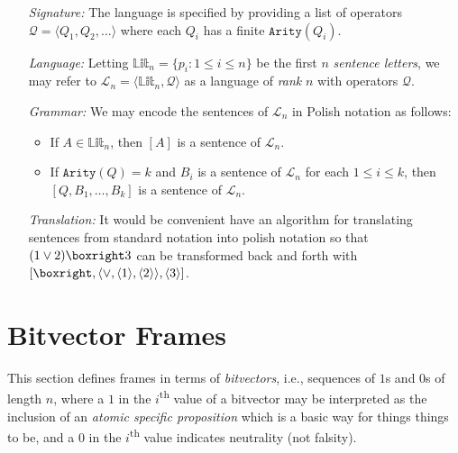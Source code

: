 \documentclass[a4paper, 11pt]{article} %
\newcommand{\tuple}[1]{\langle#1\rangle} %
\newcommand{\set}[1]{\lbrace#1\rbrace} %
\newcommand{\Lit}[0]{\mathbb{Lit}}
\newcommand{\arity}[1]{\texttt{Arity}(#1)}
\renewcommand{\L}[0]{\mathcal{L}}
\newcommand{\Q}[0]{\mathcal{Q}}
\begin{document}
\begin{enumerate}
  \item[\it Signature:] The language is specified by providing a list of operators $\Q=\tuple{Q_1,Q_2,\ldots}$ where each $Q_i$ has a finite $\arity{Q_i}$.
  \item[\it Language:] Letting $\Lit_n=\set{p_i:1\leq i\leq n}$ be the first $n$ \textit{sentence letters}, we may refer to $\L_n=\tuple{\Lit_n,\Q}$ as a language of \textit{rank} $n$ with operators $\Q$.
  \item[\it Grammar:] We may encode the sentences of $\L_n$ in Polish notation as follows:
    \begin{itemize}
      \item If $A\in\Lit_n$, then $[A]$ is a sentence of $\L_n$.
      \item If $\arity{Q}=k$ and $B_i$ is a sentence of $\L_n$ for each $1\leq i\leq k$, then $[Q,B_1,\ldots,B_k]$ is a sentence of $\L_n$.
    \end{itemize}
  \item[\it Translation:] It would be convenient have an algorithm for translating sentences from standard notation into polish notation so that $( 1 \vee 2 ) \boxright 3$ can be transformed back and forth with $[\boxright, \tuple{\vee, \tuple{1}, \tuple{2}}, \tuple{3}]$.
\end{enumerate}

\section{Bitvector Frames}

This section defines frames in terms of \textit{bitvectors}, i.e., sequences of $1$s and $0$s of length $n$, where a $1$ in the $i$\textsuperscript{th} value of a bitvector may be interpreted as the inclusion of an \textit{atomic specific proposition} which is a basic way for things things to be, and a $0$ in the $i$\textsuperscript{th} value indicates neutrality (not falsity).
\end{document}
